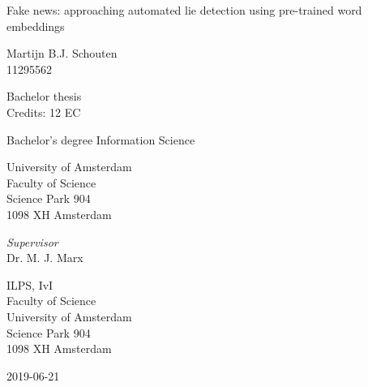 \begin{center}

\vspace{2.5cm}

\begin{Huge}
Fake news: approaching automated lie detection using pre-trained word embeddings
\end{Huge}

\vspace{1.5cm}

Martijn B.J. Schouten\\
11295562

\vspace{1.5cm}

Bachelor thesis\\
Credits: 12 EC

\vspace{0.5cm}

Bachelor's degree Information Science

\vspace{0.25cm}

University of Amsterdam\\
Faculty of Science\\
Science Park 904\\
1098 XH Amsterdam

\vspace{4cm}

\emph{Supervisor}\\
Dr. M. J. Marx

\vspace{0.25cm}

ILPS, IvI\\
Faculty of Science\\
University of Amsterdam\\
Science Park 904\\
1098 XH Amsterdam

\vspace{1.5cm}

2019-06-21

\end{center}
